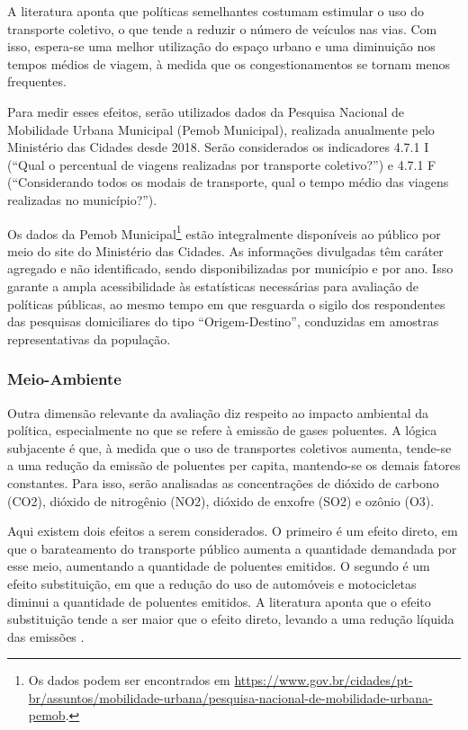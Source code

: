 A literatura aponta que políticas semelhantes costumam estimular o uso do transporte coletivo, o que tende a reduzir o número de veículos nas vias. Com isso, espera-se uma melhor utilização do espaço urbano e uma diminuição nos tempos médios de viagem, à medida que os congestionamentos se tornam menos frequentes.

Para medir esses efeitos, serão utilizados dados da Pesquisa Nacional de Mobilidade Urbana Municipal (Pemob Municipal), realizada anualmente pelo Ministério das Cidades desde 2018. Serão considerados os indicadores 4.7.1 I (“Qual o percentual de viagens realizadas por transporte coletivo?”) e 4.7.1 F (“Considerando todos os modais de transporte, qual o tempo médio das viagens realizadas no município?”). 

Os dados da Pemob Municipal\footnote{Os dados podem ser encontrados em \url{https://www.gov.br/cidades/pt-br/assuntos/mobilidade-urbana/pesquisa-nacional-de-mobilidade-urbana-pemob}.} estão integralmente disponíveis ao público por meio do site do Ministério das Cidades. As informações divulgadas têm caráter agregado e não identificado, sendo disponibilizadas por município e por ano. Isso garante a ampla acessibilidade às estatísticas necessárias para avaliação de políticas públicas, ao mesmo tempo em que resguarda o sigilo dos respondentes das pesquisas domiciliares do tipo “Origem-Destino”, conduzidas em amostras representativas da população.

\subsubsection{Meio-Ambiente}
Outra dimensão relevante da avaliação diz respeito ao impacto ambiental da política, especialmente no que se refere à emissão de gases poluentes. A lógica subjacente é que, à medida que o uso de transportes coletivos aumenta, tende-se a uma redução da emissão de poluentes per capita, mantendo-se os demais fatores constantes. Para isso, serão analisadas as concentrações de dióxido de carbono (CO2), dióxido de nitrogênio (NO2), dióxido de enxofre (SO2) e ozônio (O3).

Aqui existem dois efeitos a serem considerados. O primeiro é um efeito direto, em que o barateamento do transporte público aumenta a quantidade demandada por esse meio, aumentando a quantidade de poluentes emitidos. O segundo é um efeito substituição, em que a redução do uso de automóveis e motocicletas diminui a quantidade de poluentes emitidos. A literatura aponta que o efeito substituição tende a ser maior que o efeito direto, levando a uma redução líquida das emissões \cite{NO_DAM}. 

